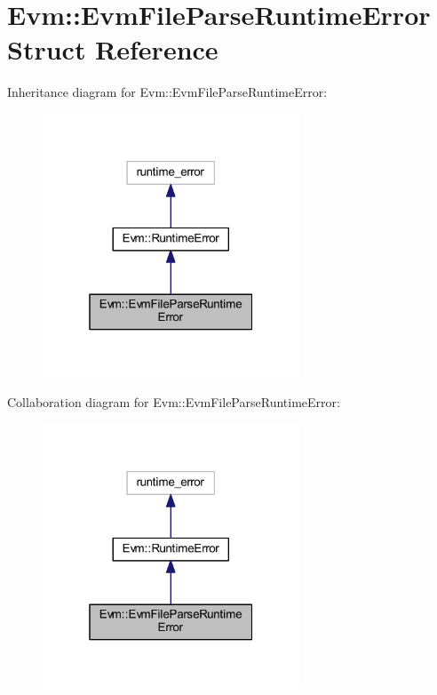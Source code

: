 \hypertarget{struct_evm_1_1_evm_file_parse_runtime_error}{}\section{Evm\+:\+:Evm\+File\+Parse\+Runtime\+Error Struct Reference}
\label{struct_evm_1_1_evm_file_parse_runtime_error}


Inheritance diagram for Evm\+:\+:Evm\+File\+Parse\+Runtime\+Error\+:
\nopagebreak
\begin{figure}[H]
\begin{center}
\leavevmode
\includegraphics[width=217pt]{struct_evm_1_1_evm_file_parse_runtime_error__inherit__graph}
\end{center}
\end{figure}


Collaboration diagram for Evm\+:\+:Evm\+File\+Parse\+Runtime\+Error\+:
\nopagebreak
\begin{figure}[H]
\begin{center}
\leavevmode
\includegraphics[width=217pt]{struct_evm_1_1_evm_file_parse_runtime_error__coll__graph}
\end{center}
\end{figure}
